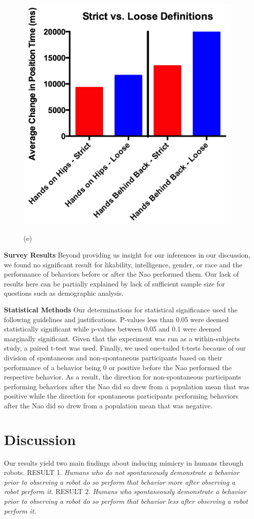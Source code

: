 \documentclass{acm_proc_article-sp}
\begin{document}
\begin{figure}[t!]
\centering
 \includegraphics[width=0.65\linewidth]{images/svl.jpg}\\
 \caption{(e)}
 \label{svl} %
\end{figure}

\textbf{Survey Results} Beyond providing us insight for our inferences in our discussion, we found no significant result for likability, intelligence, gender, or race and the performance of behaviors before or after the Nao performed them. Our lack of results here can be partially explained by lack of sufficient sample size for questions such as demographic analysis.

\textbf{Statistical Methods} Our determinations for statistical significance used the following guidelines and justifications. P-values less than 0.05 were deemed statistically significant while p-values between 0.05 and 0.1 were deemed marginally significant. Given that the experiment was run as a within-subjects study, a paired t-test was used. Finally, we used one-tailed t-tests because of our division of spontaneous and non-spontaneous participants based on their performance of a behavior being 0 or positive before the Nao performed the respective behavior. As a result, the direction for non-spontaneous participants performing behaviors after the Nao did so drew from a population mean that was positive while the direction for spontaneous participants performing behaviors after the Nao did so drew from a population mean that was negative.

\section{Discussion}
Our results yield two main findings about inducing mimicry in humans through robots.
RESULT 1. \textit{Humans who do not spontaneously demonstrate a behavior prior to observing a robot do so perform that behavior more after observing a robot perform it.}
RESULT 2. \textit{Humans who spontaneously demonstrate a behavior prior to observing a robot do so perform that behavior less after observing a robot perform it.}
\end{document}
